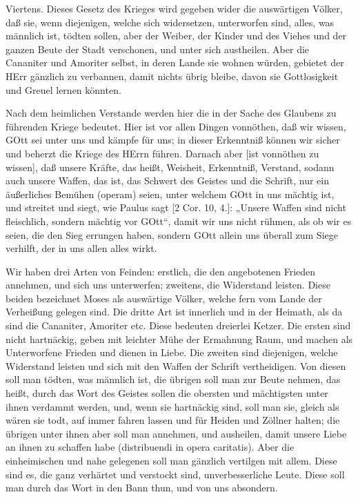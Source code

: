 Viertens. Dieses Gesetz des Krieges wird gegeben wider die auswärtigen Völker, daß sie, wenn diejenigen, welche sich widersetzen, unterworfen sind, alles, was männlich ist, tödten sollen, aber der Weiber, der Kinder und des Viehes und der ganzen Beute der Stadt verschonen, und unter sich austheilen. Aber die Cananiter und Amoriter selbst, in deren Lande sie wohnen würden, gebietet der HErr gänzlich zu verbannen, damit nichts übrig bleibe, davon sie Gottlosigkeit und Greuel lernen könnten.

Nach dem heimlichen Verstande werden hier die in der Sache des Glaubens zu führenden Kriege bedeutet. Hier ist vor allen Dingen vonnöthen, daß wir wissen, GOtt sei unter uns und kämpfe für uns; in dieser Erkenntniß können wir sicher und beherzt die Kriege des HErrn führen. Darnach aber [ist vonnöthen zu wissen], daß unsere Kräfte, das heißt, Weisheit, Erkenntniß, Verstand, sodann auch unsere Waffen, das ist, das Schwert des Geistes und die Schrift, nur ein äußerliches Bemühen (operam) seien, unter welchem GOtt in uns mächtig ist, und streitet und siegt, wie Paulus sagt [2 Cor. 10, 4.]: „Unsere Waffen sind nicht fleischlich, sondern mächtig vor GOtt“, damit wir uns nicht rühmen, als ob wir es seien, die den Sieg errungen haben, sondern GOtt allein uns überall zum Siege verhilft, der in uns allen alles wirkt.

Wir haben drei Arten von Feinden: erstlich, die den angebotenen Frieden annehmen, und sich uns unterwerfen; zweitens, die Widerstand leisten. Diese beiden bezeichnet Moses als auswärtige Völker, welche fern vom Lande der Verheißung gelegen sind. Die dritte Art ist innerlich und in der Heimath, als da sind die Cananiter, Amoriter etc. Diese bedeuten dreierlei Ketzer. Die ersten sind nicht hartnäckig, geben mit leichter Mühe der Ermahnung Raum, und machen als Unterworfene Frieden und dienen in Liebe. Die zweiten sind diejenigen, welche Widerstand leisten und sich mit den Waffen der Schrift vertheidigen. Von diesen soll man tödten, was männlich ist, die übrigen soll man zur Beute nehmen, das heißt, durch das Wort des Geistes sollen die obersten und mächtigsten unter ihnen
verdammt werden, und, wenn sie hartnäckig sind, soll man sie, gleich als wären sie todt, auf immer fahren lassen und für Heiden und Zöllner halten; die übrigen unter ihnen aber soll man annehmen, und ausheilen, damit unsere Liebe an ihnen zu schaffen habe (distribuendi in opera caritatis). Aber die einheimischen und nahe gelegenen soll man gänzlich vertilgen mit allem. Diese sind es, die ganz verhärtet und verstockt sind, unverbesserliche Leute. Diese soll man durch das Wort in den Bann thun, und von uns absondern.

